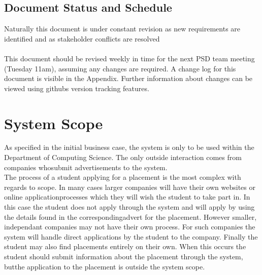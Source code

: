 \documentclass{l3deliverable}
\begin{document}
\subsection{Document Status and Schedule}
Naturally this document is under constant revision as new requirements are identified and as stakeholder conflicts are resolved\\
\\
This document should be revised weekly in time for the next PSD team meeting (Tuesday 11am), assuming any changes are required. A change log for this document is visible in the Appendix. Further information about changes can be viewed using githubs version tracking features.


\newpage
\section{System Scope}
As specified in the initial business case, the system is only to be used within the Department of Computing Science. The only outside interaction comes from companies whosubmit advertisements to the system. \\
The process of a student applying for a placement is the most complex with regards to scope. In many cases larger companies will have their own websites or online applicationprocesses which they will wish the student to take part in. In this case the student does not apply through the system and will apply by using the details found in the correspondingadvert for the placement. However smaller, independant companies may not have their own process. For such companies the system will handle direct applications by the student to the company. Finally the student may also find placements entirely on their own. When this occurs the student should submit information about the placement through the system, butthe application to the placement is outside the system scope.\\

\end{document}

